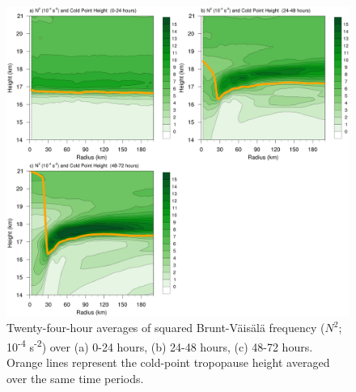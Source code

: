 \begin{figure}[ht]
\centerline{\includegraphics[width=39pc]{figures/n2-24hr-avgs.png}}
\caption{Twenty-four-hour averages of squared Brunt-V{\"a}is{\"a}l{\"a} frequency ($N^2$; 10\textsuperscript{-4} s\textsuperscript{-2}) over (a) 0-24 hours, (b) 24-48 hours, (c) 48-72 hours.
Orange lines represent the cold-point tropopause height averaged over the same time periods.}
\label{fig:n2-24hr-avgs}
\end{figure}

